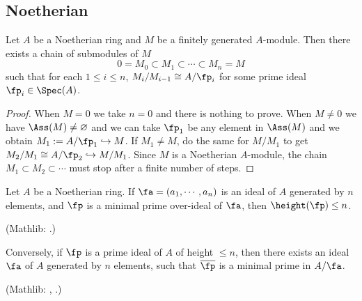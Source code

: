 \subsection{Noetherian}

\begin{prop}
\label{noeth-ring-filtration}
\leanok
Let $A$ be a Noetherian ring and $M$ be a finitely generated $A$-module.
Then there exists a chain of submodules of $M$
\[0 = M_0 \subset M_1 \subset \cdots \subset M_n = M\]
such that for each $1\leq i\leq n$, $M_i/M_{i-1} \cong A/\fp_i$ for some prime ideal $\fp_i\in\Spec(A)$.
\end{prop}

\begin{proof}
\leanok
When $M=0$ we take $n=0$ and there is nothing to prove.
When $M\neq 0$ we have $\Ass(M)\neq\varnothing$
and we can take $\fp_1$ be any element in $\Ass(M)$
and we obtain $M_1:=A/\fp_1\hookrightarrow M$.
If $M_1\neq M$, do the same for $M/M_1$ to get $M_2/M_1\cong A/\fp_2\hookrightarrow M/M_1$.
Since $M$ is a Noetherian $A$-module,
the chain $M_1\subset M_2\subset\cdots$ must stop after a finite number of steps.
\end{proof}

\begin{thm}
\leanok
\label{krull-principal-ideal-thm}
Let $A$ be a Noetherian ring.
If $\fa=(a_1,\cdots,a_n)$ is an ideal of $A$ generated by $n$ elements,
and $\fp$ is a minimal prime over-ideal of $\fa$, then $\height(\fp)\leq n$.

(Mathlib: .)

Conversely, if $\fp$ is a prime ideal of $A$ of height $\leq n$,
then there exists an ideal $\fa$ of $A$ generated by $n$ elements, such that
$\overline\fp$ is a minimal prime in $A/\fa$.

(Mathlib: ,
.)
\end{thm}

